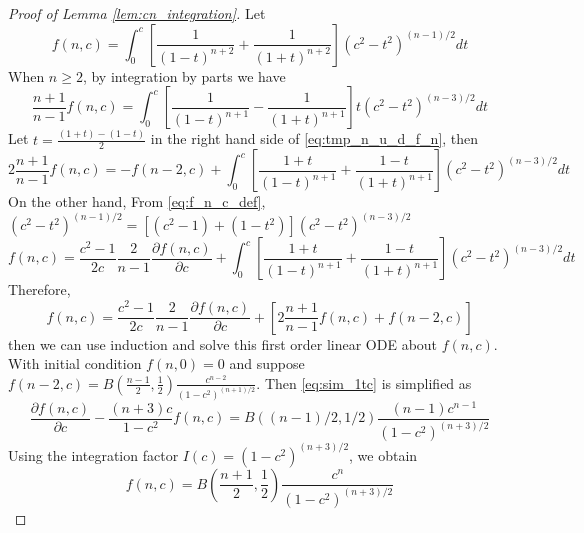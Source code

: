 \documentclass{aptpub}
\begin{document}
\begin{proof}[Proof of Lemma \ref{lem:cn_integration}]
     Let
\begin{equation}\label{eq:f_n_c_def}
 f(n,c)=   \int_0^{c}
    [\frac{1}{(1-t)^{n+2}}+\frac{1}{(1+t)^{n+2}}]
    (c^2- t^2)^{(n-1)/2}dt
\end{equation}
When $n\geq 2$, by integration by parts 
we have 
\begin{equation}\label{eq:tmp_n_u_d_f_n}
    \frac{n+1}{n-1}f(n,c)
    =\int_0^{c}
    \left[\frac{1}{(1-t)^{n+1}}
    -\frac{1}{(1+t)^{n+1}}
    \right]
    t(c^2- t^2)^{(n-3)/2}
    dt
\end{equation}
Let $t=\frac{(1+t)-(1-t)}{2}$ in the right hand side
of \eqref{eq:tmp_n_u_d_f_n}, then
\begin{equation}
    2\frac{n+1}{n-1}f(n,c)
=    -f(n-2,c)  
+ \int_0^{c}
\left[\frac{1+t}{(1-t)^{n+1}}
+\frac{1-t}{(1+t)^{n+1}}
\right]
(c^2- t^2)^{(n-3)/2}
dt
\end{equation}
On the other hand,
From \eqref{eq:f_n_c_def},
$(c^2-t^2)^{(n-1)/2}
=[(c^2-1)+(1-t^2)](c^2-t^2)^{(n-3)/2}$
\begin{equation}
    f(n, c) = \frac{c^2-1}{2c}\frac{2}{n-1}\frac{\partial f(n,c)}{\partial c}
    +  \int_0^{c}
    \left[\frac{1+t}{(1-t)^{n+1}}
    +\frac{1-t}{(1+t)^{n+1}}
    \right]
    (c^2- t^2)^{(n-3)/2}
    dt
\end{equation}
Therefore,
\begin{equation}\label{eq:sim_1tc}
    f(n,c)=\frac{c^2-1}{2c}\frac{2}{n-1}\frac{\partial f(n,c)}{\partial c}
    + [2\frac{n+1}{n-1} f(n,c) + f(n-2, c)]
\end{equation}
then we can use induction and solve this
first order linear ODE about $f(n,c)$.
With initial condition $f(n,0)=0$ and
suppose
$f(n-2,c)=B(\frac{n-1}{2}, \frac{1}{2})
\frac{c^{n-2}}{(1-c^2)^{(n+1)/2}}$.
Then \eqref{eq:sim_1tc} is simplified as
\begin{equation}
    \frac{\partial f(n,c)}{\partial c}
    - \frac{(n+3)c}{1-c^2} f(n,c)
    = B((n-1)/2, 1/2)\frac{(n-1)c^{n-1}}{(1-c^2)^{(n+3)/2}}
\end{equation}
Using the integration factor $I(c)=(1-c^2)^{(n+3)/2}$, we obtain
\begin{equation}
    f(n,c)= B(\frac{n+1}{2}, \frac{1}{2})
    \frac{c^n}{(1-c^2)^{(n+3)/2}}
\end{equation}

\end{proof}
\end{document}
